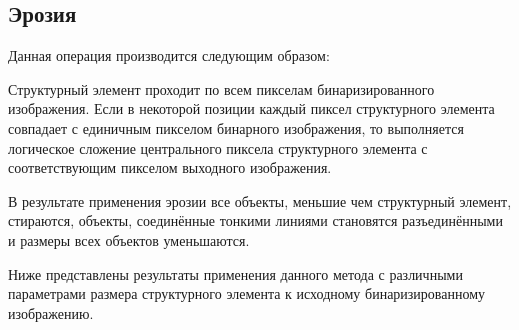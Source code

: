 \begin{figure}[H]
	\begin{minipage}[h]{0.49\linewidth}
	\end{minipage}
	\hfill
	\begin{minipage}[h]{0.49\linewidth}
	\end{minipage}
	\vfill
	\begin{minipage}[h]{0.49\linewidth}
	\end{minipage}
	\hfill
	\begin{minipage}[h]{0.49\linewidth}
	\end{minipage}
\end{figure}

\newpage

\subsection{Эрозия}

Данная операция производится следующим образом: 

Структурный элемент проходит по всем пикселам бинаризированного изображения. Если в некоторой позиции каждый пиксел структурного элемента совпадает с единичным пикселом бинарного изображения, то выполняется логическое сложение центрального пиксела структурного элемента с соответствующим пикселом выходного изображения. 

В результате применения эрозии все объекты, меньшие чем структурный элемент, стираются, объекты, соединённые тонкими линиями становятся разъединёнными и размеры всех объектов уменьшаются.

Ниже представлены результаты применения данного метода с различными параметрами размера структурного элемента к исходному бинаризированному изображению.

